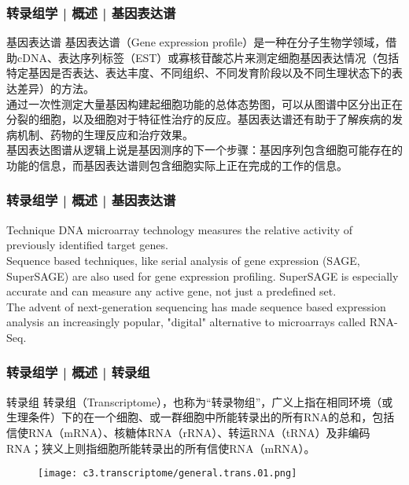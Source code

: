 \begin{frame}
  \frametitle{转录组学 | 概述 | 基因表达谱}
  \begin{block}{基因表达谱}
    基因表达谱（Gene expression profile）是一种在分子生物学领域，借助cDNA、表达序列标签（EST）或寡核苷酸芯片来测定细胞基因表达情况（包括特定基因是否表达、表达丰度、不同组织、不同发育阶段以及不同生理状态下的表达差异）的方法。\\
\vspace{1em}
通过一次性测定大量基因构建起细胞功能的总体态势图，可以从图谱中区分出正在分裂的细胞，以及细胞对于特征性治疗的反应。基因表达谱还有助于了解疾病的发病机制、药物的生理反应和治疗效果。\\
\vspace{1em}
基因表达图谱从逻辑上说是基因测序的下一个步骤：基因序列包含细胞可能存在的功能的信息，而基因表达谱则包含细胞实际上正在完成的工作的信息。
  \end{block}
\end{frame}

\begin{frame}
  \frametitle{转录组学 | 概述 | 基因表达谱}
  \begin{block}{Technique}
    DNA microarray technology measures the relative activity of previously identified target genes.\\
    \vspace{1em}
 Sequence based techniques, like serial analysis of gene expression (SAGE, SuperSAGE) are also used for gene expression profiling. SuperSAGE is especially accurate and can measure any active gene, not just a predefined set.\\
 \vspace{1em}
 The advent of next-generation sequencing has made sequence based expression analysis an increasingly popular, "digital" alternative to microarrays called RNA-Seq. 
  \end{block}
\end{frame}

\begin{frame}
  \frametitle{转录组学 | 概述 | 转录组}
  \begin{block}{转录组}
转录组（Transcriptome），也称为“转录物组”，广义上指在相同环境（或生理条件）下的在一个细胞、或一群细胞中所能转录出的所有RNA的总和，包括信使RNA（mRNA）、核糖体RNA（rRNA）、转运RNA（tRNA）及非编码RNA；狭义上则指细胞所能转录出的所有信使RNA（mRNA）。
  \end{block}
  \begin{figure}
    \centering
    \texttt{[image: c3.transcriptome/general.trans.01.png]}
  \end{figure}
\end{frame}

